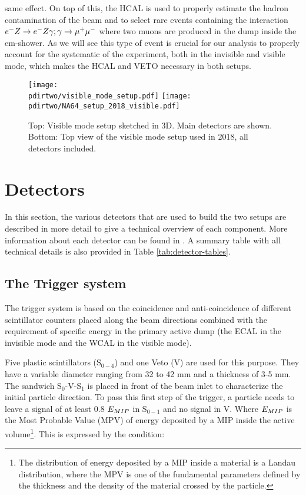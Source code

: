 same effect. On top of this, the HCAL is used to properly estimate the hadron contamination of the beam and to select rare events containing the interaction $e^- Z \to e^- Z \gamma; \gamma \to \mu^+ \mu^-$ where two muons are produced in the dump inside the em-shower. As we will see this type of event is crucial for our analysis to properly account for the systematic of the experiment, both in the invisible and visible mode, which makes the HCAL and VETO necessary in both setups.

\begin{figure}[tb]
  \centering
  \texttt{[image: \\pdirtwo/visible\_mode\_setup.pdf]}  
  \texttt{[image: \\pdirtwo/NA64\_setup\_2018\_visible.pdf]}
  \caption[NA64 visible mode setup 2018]{Top: Visible mode setup sketched in 3D. Main detectors are shown. Bottom: Top view of the visible mode setup used in 2018, all detectors included.}
  \label{fig:setup-vis-2018}
\end{figure}

\section{Detectors}
\label{ch2:sec:detectors}

In this section, the various detectors that are used to build the two setups are described in more detail to give a technical overview of each component. More information about each detector can be found in \cite{na64-hcal,na64-detectors,ABBON201569}. A summary table with all technical details is also provided in Table \ref{tab:detector-tables}.

\subsection{The Trigger system}
\label{ch2:sec:detectors-trigger}

The trigger system is based on the coincidence and anti-coincidence of different scintillator counters placed along the beam directions combined with the requirement of specific energy in the primary active dump (the ECAL in the invisible mode and the WCAL in the visible mode).

Five plastic scintillators (S$_{0-4}$) and one Veto (V) are used for this purpose. They have a variable diameter ranging from 32 to 42 \si{mm} and a thickness of 3-5 \si{mm}. The sandwich S$_0$-V-S$_1$ is placed in front of the beam inlet to characterize the initial particle direction. To pass this first step of the trigger, a particle needs to leave a signal of at least 0.8 $E_{MIP}$ in S$_{0-1}$ and no signal in V. Where $E_{MIP}$ is the Most Probable Value (MPV) of energy deposited by a MIP inside the active volume\footnote{The distribution of energy deposited by a MIP inside a material is a Landau distribution, where the MPV is one of the fundamental parameters defined by the thickness and the density of the material crossed by the particle.}. This is expressed by the condition:


